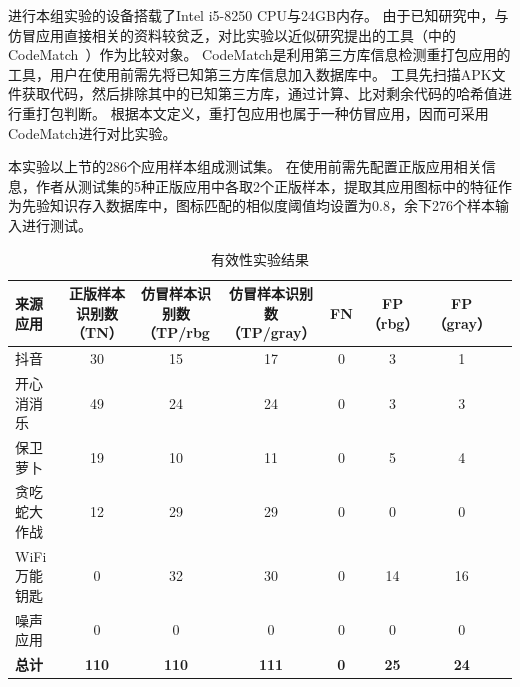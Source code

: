 进行本组实验的设备搭载了Intel i5-8250 CPU与24GB内存。
由于已知研究中，与仿冒应用直接相关的资料较贫乏，对比实验以近似研究提出的工具（中的CodeMatch~\cite{CodeMatch}）作为比较对象。
CodeMatch是利用第三方库信息检测重打包应用的工具，用户在使用前需先将已知第三方库信息加入数据库中。
工具先扫描APK文件获取代码，然后排除其中的已知第三方库，通过计算、比对剩余代码的哈希值进行重打包判断。
根据本文定义，重打包应用也属于一种仿冒应用，因而可采用CodeMatch进行对比实验。


本实验以上节的286个应用样本组成测试集。
\mytool 在使用前需先配置正版应用相关信息，作者从测试集的5种正版应用中各取2个正版样本，提取其应用图标中的特征作为先验知识存入数据库中，图标匹配的相似度阈值均设置为0.8，余下276个样本输入\mytool 进行测试。

\begin{table}[htbp]
    \renewcommand{\arraystretch}{1}
    \footnotesize
    \centering
    \caption{有效性实验结果}
    \vspace{1mm}
    \begin{tabular}{l ccccccc}
        \toprule
        \bf{来源应用}                  & \makecell[c]{\bf 正版样本识别数                                                     \\ \bf （TN）} & \makecell[c]{\bf 仿冒样本识别数 \\ \bf （TP/rbg} & \makecell[c]{\bf 仿冒样本识别数 \\ \bf （TP/gray）} & {\bf FN} & \makecell[c]{\bf FP \\ \bf （rbg）} & \makecell[c]{\bf FP \\ \bf （gray）} \\
        \midrule
        抖音                           & 30                              & 15        & 17       & 0      & 3       & 1       \\
        \rowcolor{gray!15}开心消消乐   & 49                              & 24        & 24       & 0      & 3       & 3       \\
        保卫萝卜                       & 19                              & 10        & 11       & 0      & 5       & 4       \\
        \rowcolor{gray!15}贪吃蛇大作战 & 12                              & 29        & 29       & 0      & 0       & 0       \\
        WiFi万能钥匙                   & 0                               & 32        & 30       & 0      & 14      & 16      \\
        \rowcolor{gray!15}噪声应用     & 0                               & 0         & 0        & 0      & 0       & 0       \\
        {\bf 总计}                     & {\bf 110}                       & {\bf 110} & {\bf111} & {\bf0} & {\bf25} & {\bf24} \\
        \bottomrule
    \end{tabular}
    \label{table:exp_1_effectiveness}
\end{table}

